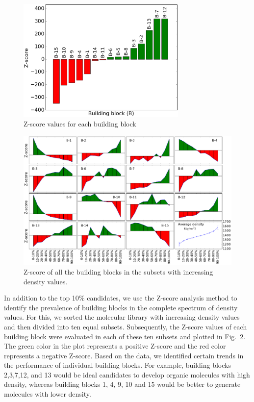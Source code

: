 \begin{figure}[htbp] 
	\centering
	\includegraphics[width=0.744\textwidth]{Chapter-6/Figures/BB_top_Z.eps}
	\caption{Z-score values for each building block}
	\label{fig:BB_top_Z} 
\end{figure} 

\begin{figure}[htbp] 
	\centering
	\includegraphics[width=1.0\textwidth]{Chapter-6/Figures/All_BB_Z.eps}
	\caption{Z-score of all the building blocks in the subsets with increasing density values.} 
	\label{fig:BB_all_Z} 
\end{figure}

In addition to the top 10\% candidates, we use the Z-score analysis method to identify the prevalence of building blocks in the complete spectrum of density values. For this, we sorted the molecular library with increasing density values and then divided into ten equal subsets. Subsequently, the Z-score values of each building block were evaluated in each of these ten subsets and plotted in Fig.\ \ref{fig:BB_all_Z}. The green color in the plot represents a positive Z-score and the red color represents a negative Z-score. Based on the data, we identified certain trends in the performance of individual building blocks. For example, building blocks 2,3,7,12, and 13 would be ideal candidates to develop organic molecules with high density, whereas building blocks 1, 4, 9, 10 and 15 would be better to generate molecules with lower density. %


